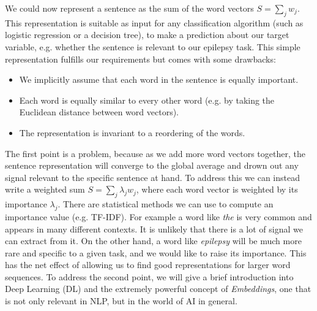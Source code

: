 We could now represent a sentence as the sum of the word vectors $S = \sum_j w_j$. This representation is suitable as input for any classification algorithm (such as logistic regression or a decision tree), to make a prediction about our target variable, e.g. whether the sentence is relevant to our epilepsy task.
This simple representation fulfills our requirements but comes with some drawbacks:
\begin{itemize}
    \item We implicitly assume that each word in the sentence is equally important.
    \item Each word is equally similar to every other word (e.g. by taking the Euclidean distance between word vectors).
    \item The representation is invariant to a reordering of the words.
\end{itemize}
The first point is a problem, because as we add more word vectors together, the sentence representation will converge to the global average and drown out any signal relevant to the specific sentence at hand.
To address this we can instead write a weighted sum $S = \sum_j \lambda_j w_j$, where each word vector is weighted by its importance $\lambda_j$. There are statistical methods we can use to compute an importance value (e.g. TF-IDF).
For example a word like \textit{the} is very common and appears in many different contexts.
It is unlikely that there is a lot of signal we can extract from it.
On the other hand, a word like \textit{epilepsy} will be much more rare and specific to a given task, and we would like to raise its importance.
This has the net effect of allowing us to find good representations for larger word sequences.
To address the second point, we will give a brief introduction into Deep Learning (DL) and the extremely powerful concept of \textit{Embeddings}, one that is not only relevant in NLP, but in the world of AI in general.
